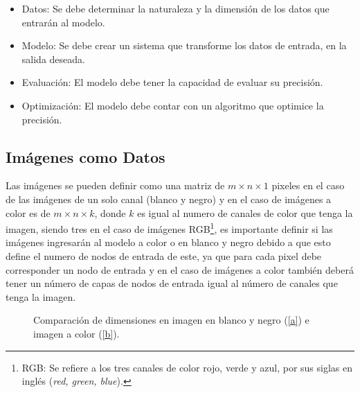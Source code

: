 \begin{itemize}
    \item Datos: Se debe determinar la naturaleza y la dimensión de los datos que entrarán al modelo.
    \item Modelo: Se debe crear un sistema que transforme los datos de entrada, en la salida deseada.
    \item Evaluación: El modelo debe tener la capacidad de evaluar su precisión.
    \item Optimización: El modelo debe contar con un algoritmo que optimice la precisión.
\end{itemize}

\subsection{Imágenes como Datos}
Las imágenes se pueden definir como una matriz de $m \times n \times 1$ pixeles en el caso de las imágenes de un solo canal (blanco y negro) y en el caso de imágenes a color es de $m \times n \times k$, donde $k$ es igual al numero de canales de color que tenga la imagen, siendo tres en el caso de imágenes RGB\footnote{RGB: Se refiere a los tres canales de color rojo, verde y azul, por sus siglas en inglés (\emph{red, green, blue}).}, es importante definir si las imágenes ingresarán al modelo a color o en blanco y negro debido a que esto define el numero de nodos de entrada de este, ya que para cada pixel debe corresponder un nodo de entrada y en el caso de imágenes a color también deberá tener un número de capas de nodos de entrada igual al número de canales que tenga la imagen.

\begin{figure}[!htp]
    \centering
    \qquad
    \caption{Comparación de dimensiones en imagen en blanco y negro (\ref{a}) e imagen a color (\ref{b}).}
    \label{matrix_img}
\end{figure}

